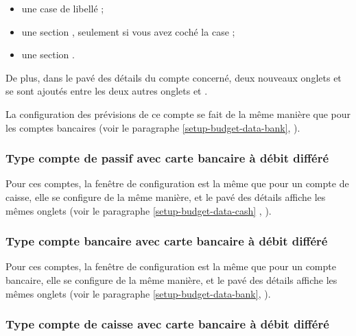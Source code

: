 \begin{itemize}
	\item une case de libellé  ; 
	\item une section , seulement si vous avez coché la case  ; 
	\item une section .
\end{itemize}

De plus, dans le pavé des détails du compte concerné, deux nouveaux onglets  et  se sont ajoutés entre les deux autres onglets  et .

La configuration des prévisions de ce compte se fait de la même manière que pour les comptes bancaires (voir le paragraphe \vref{setup-budget-data-bank}, ).



\subsubsection{Type compte de passif avec carte bancaire à débit différé\label{setup-budget-data-liabilityWithCard}}

Pour ces comptes, la fenêtre de configuration est la même que pour un compte de caisse, elle se configure de la même manière, et le pavé des détails affiche les mêmes onglets (voir le paragraphe \vref{setup-budget-data-cash} , ).

\ifIllustration
\newpage
\fi


\subsubsection{Type compte bancaire avec carte bancaire à débit différé\label{setup-budget-data-bankWithCard}}

Pour ces comptes, la fenêtre de configuration est la même que pour un compte bancaire, elle se configure de la même manière, et le pavé des détails affiche les mêmes onglets (voir le paragraphe \vref{setup-budget-data-bank}, ).


\subsubsection{Type compte de caisse avec carte bancaire à débit différé\label{setup-budget-data-cashWithCard}}

